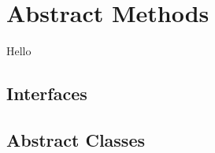 \chapter{Abstract Methods}

Hello

\section{Interfaces}
\csharpsubsection{\csharp}





\section{Abstract Classes}
\csharpsubsection{\csharp}


